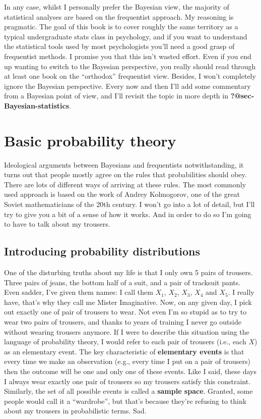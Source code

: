 \documentclass[
  letterpaper,
]{book}
\begin{document}
In any case, whilst I personally prefer the Bayesian view, the majority
of statistical analyses are based on the frequentist approach. My
reasoning is pragmatic. The goal of this book is to cover roughly the
same territory as a typical undergraduate stats class in psychology, and
if you want to understand the statistical tools used by most
psychologists you'll need a good grasp of frequentist methods. I promise
you that this isn't wasted effort. Even if you end up wanting to switch
to the Bayesian perspective, you really should read through at least one
book on the ``orthodox'' frequentist view. Besides, I won't completely
ignore the Bayesian perspective. Every now and then I'll add some
commentary from a Bayesian point of view, and I'll revisit the topic in
more depth in \textbf{?@sec-Bayesian-statistics}.

\hypertarget{basic-probability-theory}{%
\section{Basic probability theory}\label{basic-probability-theory}}

Ideological arguments between Bayesians and frequentists
notwithstanding, it turns out that people mostly agree on the rules that
probabilities should obey. There are lots of different ways of arriving
at these rules. The most commonly used approach is based on the work of
Andrey Kolmogorov, one of the great Soviet mathematicians of the 20th
century. I won't go into a lot of detail, but I'll try to give you a bit
of a sense of how it works. And in order to do so I'm going to have to
talk about my trousers.

\hypertarget{introducing-probability-distributions}{%
\subsection{Introducing probability
distributions}\label{introducing-probability-distributions}}

One of the disturbing truths about my life is that I only own 5 pairs of
trousers. Three pairs of jeans, the bottom half of a suit, and a pair of
tracksuit pants. Even sadder, I've given them names: I call them
\(X_1\), \(X_2\), \(X_3\), \(X_4\) and \(X_5\). I really have, that's
why they call me Mister Imaginative. Now, on any given day, I pick out
exactly one of pair of trousers to wear. Not even I'm so stupid as to
try to wear two pairs of trousers, and thanks to years of training I
never go outside without wearing trousers anymore. If I were to describe
this situation using the language of probability theory, I would refer
to each pair of trousers (i.e., each \(X\)) as an elementary event. The
key characteristic of \textbf{elementary events} is that every time we
make an observation (e.g., every time I put on a pair of trousers) then
the outcome will be one and only one of these events. Like I said, these
days I always wear exactly one pair of trousers so my trousers satisfy
this constraint. Similarly, the set of all possible events is called a
\textbf{sample space}. Granted, some people would call it a
``wardrobe'', but that's because they're refusing to think about my
trousers in probabilistic terms. Sad.
\end{document}
